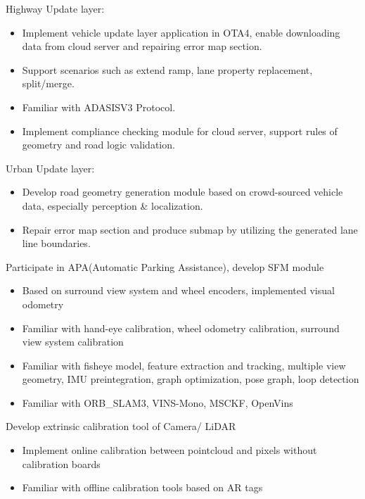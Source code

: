 \documentclass{resume}
\begin{document}
Highway Update layer:
\begin{itemize}
  \item Implement vehicle update layer application in OTA4, enable downloading data from cloud server and repairing error map section.
  \item Support scenarios such as extend ramp, lane property replacement, split/merge.
  \item Familiar with ADASISV3 Protocol.
  \item Implement compliance checking module for cloud server, support rules of geometry and road logic validation.
\end{itemize}

Urban Update layer:
\begin{itemize}
  \item Develop road geometry generation module based on crowd-sourced vehicle data, especially perception \& localization.
  \item Repair error map section and produce submap by utilizing the generated lane line boundaries.
\end{itemize}



Participate in APA(Automatic Parking Assistance), develop SFM module
\begin{itemize}
  \item Based on surround view system and wheel encoders, implemented visual odometry
  \item Familiar with hand-eye calibration, wheel odometry calibration, surround view system calibration
  \item Familiar with fisheye model, feature extraction and tracking, multiple view geometry, IMU preintegration, graph optimization, pose graph, loop detection
  \item Familiar with ORB\_SLAM3, VINS-Mono, MSCKF, OpenVins
\end{itemize}

Develop extrinsic calibration tool of Camera/ LiDAR
\begin{itemize}
  \item Implement online calibration between pointcloud and pixels without calibration boards
  \item Familiar with offline calibration tools based on AR tags
\end{itemize}
\end{document}
